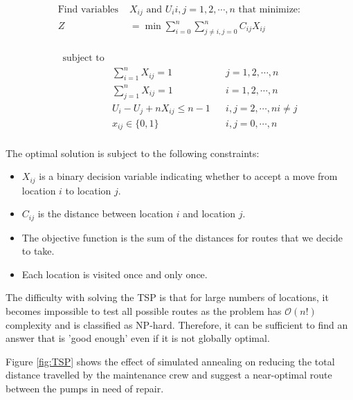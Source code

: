 \documentclass{article} %
\begin{document}
\begin{multicols}{2}
\begin{align*}
\textrm{Find variables }& X_{ij}  \textrm{ and } U_i i,j = 1, 2, \cdots , n \textrm{ that minimize}:\\
Z &= \min \sum_{i=0}^n \sum_{j\ne i,j=0}^n C_{ij} X_{ij}\\
\end{align*}

\begin{align*}
\textrm{subject to} & \\
	& \sum_{i=1}^n X_{ij} = 1 && j = 1, 2 , \cdots, n \\
	& \sum_{j=1}^n X_{ij} = 1 && i = 1, 2, \cdots, n \\
	&U_i - U_j + nX_{ij} \le n-1 && i, j = 2, \cdots, n i\ne j \\
	& x_{ij} \in \{0, 1\} && i,j=0, \cdots, n \\
\end{align*}

The optimal solution is subject to the following constraints:

\begin{itemize}
  \item $X_{ij}$ is a binary decision variable indicating whether to accept a move from location $i$ to location $j$.
  \item $C_{ij}$ is the distance between location $i$ and location $j$.
  \item The objective function is the sum of the distances for routes that we decide to take.
  \item Each location is visited once and only once.
\end{itemize}

The difficulty with solving the TSP is that for large numbers of locations, it becomes impossible to test all possible routes as the problem has $\mathcal{O}$$(n!)$ complexity and is classified as NP-hard. Therefore, it can be sufficient to find an answer that is 'good enough' even if it is not globally optimal. 

Figure \ref{fig:TSP} shows the effect of simulated annealing on reducing the total distance travelled by the maintenance crew and suggest a near-optimal route between the pumps in need of repair.


\end{multicols}
\end{document}
